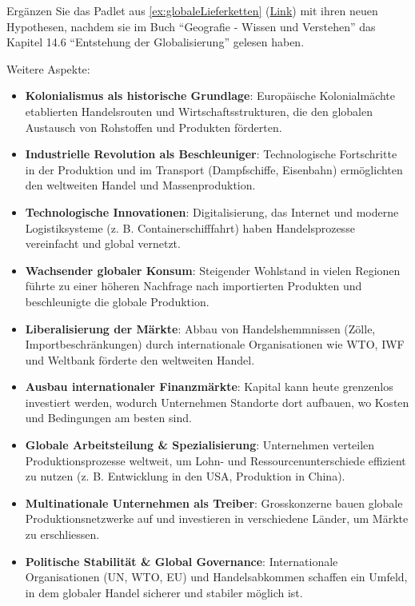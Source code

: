 \begin{myexercise}
    Ergänzen Sie das Padlet aus \cref{ex:globaleLieferketten} (\href{https://padlet.com/serafinschneider/ursachen-globalisierung-n4umvx8vos79ow8i}{Link}) mit ihren neuen Hypothesen, nachdem sie im Buch \enquote{Geografie - Wissen und Verstehen} \cite{hep} das Kapitel 14.6 \enquote{Entstehung der Globalisierung} gelesen haben.
    \begin{myanswer}
        Weitere Aspekte:

        \begin{itemize}
            \item \textbf{Kolonialismus als historische Grundlage}: Europäische Kolonialmächte etablierten Handelsrouten und Wirtschaftsstrukturen, die den globalen Austausch von Rohstoffen und Produkten förderten.
            \item \textbf{Industrielle Revolution als Beschleuniger}: Technologische Fortschritte in der Produktion und im Transport (Dampfschiffe, Eisenbahn) ermöglichten den weltweiten Handel und Massenproduktion.
            \item \textbf{Technologische Innovationen}: Digitalisierung, das Internet und moderne Logistiksysteme (z. B. Containerschifffahrt) haben Handelsprozesse vereinfacht und global vernetzt.
            \item \textbf{Wachsender globaler Konsum}: Steigender Wohlstand in vielen Regionen führte zu einer höheren Nachfrage nach importierten Produkten und beschleunigte die globale Produktion.
            \item \textbf{Liberalisierung der Märkte}: Abbau von Handelshemmnissen (Zölle, Importbeschränkungen) durch internationale Organisationen wie \gls{WTO}, \gls{IWF} und Weltbank förderte den weltweiten Handel.
            \item \textbf{Ausbau internationaler Finanzmärkte}: Kapital kann heute grenzenlos investiert werden, wodurch Unternehmen Standorte dort aufbauen, wo Kosten und Bedingungen am besten sind.
            \item \textbf{Globale Arbeitsteilung \& Spezialisierung}: Unternehmen verteilen Produktionsprozesse weltweit, um Lohn- und Ressourcenunterschiede effizient zu nutzen (z. B. Entwicklung in den USA, Produktion in China).
            \item \textbf{Multinationale Unternehmen als Treiber}: Grosskonzerne bauen globale Produktionsnetzwerke auf und investieren in verschiedene Länder, um Märkte zu erschliessen.
            \item \textbf{Politische Stabilität \& Global Governance}:
                  Internationale Organisationen (\gls{UN}, \gls{WTO}, \gls{EU}) und Handelsabkommen schaffen ein Umfeld, in dem globaler Handel sicherer und stabiler möglich ist.
        \end{itemize}

    \end{myanswer}
\end{myexercise}

